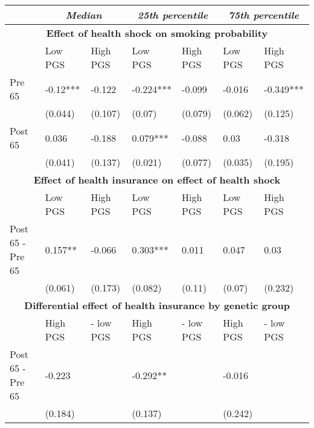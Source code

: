 % 
\begin{tabular}{l| p{2cm}p{2cm}| p{2cm}p{2cm}| p{2cm}p{2cm}}
  & \multicolumn{2}{c}{ \textit{Median}} & \multicolumn{2}{c}{ \textit{25th percentile}} & \multicolumn{2}{c}{ \textit{75th percentile}} \\
 \toprule
  \multicolumn{7}{c}{ \textbf{Effect of health shock on smoking probability}} \\
 \midrule
 & Low PGS & High PGS & Low PGS & High PGS & Low PGS & High PGS \\ 
   \midrule
Pre 65 & -0.12*** & -0.122 & -0.224*** & -0.099 & -0.016 & -0.349*** \\ 
   & (0.044) & (0.107) & (0.07) & (0.079) & (0.062) & (0.125) \\ 
  Post 65 & 0.036 & -0.188 & 0.079*** & -0.088 & 0.03 & -0.318 \\ 
   & (0.041) & (0.137) & (0.021) & (0.077) & (0.035) & (0.195) \\ 
   \toprule \multicolumn{7}{c}{ \textbf{Effect of health insurance on effect of health shock}} \\
 \midrule
 & Low PGS & High PGS & Low PGS & High PGS & Low PGS & High PGS \\ 
   \midrule
Post 65 - Pre 65 & 0.157** & -0.066 & 0.303*** & 0.011 & 0.047 & 0.03 \\ 
   & (0.061) & (0.173) & (0.082) & (0.11) & (0.07) & (0.232) \\ 
   \toprule \multicolumn{7}{c}{ \textbf{Differential effect of health insurance by genetic group}} \\
 \midrule
 & High PGS  & - low PGS & High PGS  & - low PGS & High PGS  & - low PGS \\ 
   \midrule
Post 65 - Pre 65 & -0.223 &  & -0.292** &  & -0.016 &  \\ 
   & (0.184) &  & (0.137) &  & (0.242) &  \\ 
  \end{tabular}
